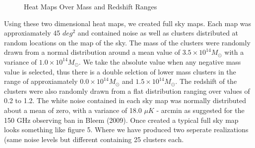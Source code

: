 \documentclass[12pt]{article} %
\begin{document}
\begin{figure}[!ht]
    \hfill
    \hfill
    \vfill
    \hfill
    \hfill
    \vfill
    \hfill
    \hfill
    \caption{Heat Maps Over Mass and Redshift Ranges}
    \label{fig:dummy}
  \end{figure}

Using these two dimensional heat maps, we created full sky maps. Each map was approxiamately 45 $deg^2$ and contained noise as well as clusters distributed at random locations on the map of the sky. The mass of the clusters were randomly drawn from a normal distribution around a mean value of $3.5\times 10^{14} M_{\odot}$ with a variance of $1.0\times 10^{14} M_{\odot}$. We take the absolute value when any negative mass value is selected, thus there is a double selction of lower mass clusters in the range of approxiamately $0.0\times 10^{14} M_{\odot}$ and $1.5\times 10^{14} M_{\odot}$. The redshift of the clusters were also randomly drawn from a flat distribution ranging over values of 0.2 to 1.2. The white noise contained in each sky map was normally distributed about a mean of zero, with a variance of 18.0 $\mu K$ - arcmin as suggested for the 150 GHz observing ban in Bleem (2009).  Once created a typical full sky map looks something like figure 5. Where we have produced two seperate realizations (same noise levels but different containing 25 clusters each. 
\end{document}
